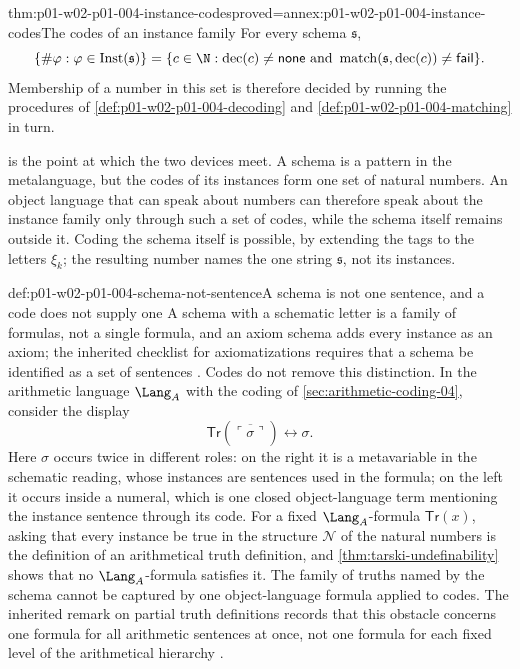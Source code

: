 \begin{hbtheorem}{thm:p01-w02-p01-004-instance-codes}{proved=annex:p01-w02-p01-004-instance-codes}{The codes of an instance family}
For every schema \(\mathfrak s\),
\[
 \{\#\varphi:\varphi\in\operatorname{Inst}(\mathfrak s)\}
 =\{c\in\N:\operatorname{dec}(c)\ne\mathsf{none}\text{ and }
    \operatorname{match}(\mathfrak s,\operatorname{dec}(c))\ne\mathsf{fail}\}.
\]
Membership of a number in this set is therefore decided by running the
procedures of \cref{def:p01-w02-p01-004-decoding} and
\cref{def:p01-w02-p01-004-matching} in turn.
\end{hbtheorem}

 is the point at which the two
devices meet. A schema is a pattern in the metalanguage, but the codes of its
instances form one set of natural numbers. An object language that can speak
about numbers can therefore speak about the instance family only through such
a set of codes, while the schema itself remains outside it. Coding the
schema itself is possible, by extending the tags to the letters \(\xi_k\);
the resulting number names the one string \(\mathfrak s\), not its instances.

\begin{hbwarning}{def:p01-w02-p01-004-schema-not-sentence}{A schema is not one sentence, and a code does not supply one}
A schema with a schematic letter is a family of formulas, not a single
formula, and an axiom schema adds every instance as an axiom; the inherited
checklist for axiomatizations requires that a schema be identified as a set
of sentences \cite[ch.~``Theories and Axiomatization'', warning on writing an
axiomatization, item~6]{FrozenFormalLogicSchemasCodes}. Codes do not remove
this distinction. In the arithmetic language \(\Lang_A\) with the coding of
\cref{sec:arithmetic-coding-04}, consider the display
\[
 \mathsf{Tr}(\overline{\ulcorner\sigma\urcorner})\leftrightarrow\sigma .
\]
Here \(\sigma\) occurs twice in different roles: on the right it is a
metavariable in the schematic reading, whose instances are sentences used in
the formula; on the left it occurs inside a numeral, which is one closed
object-language term mentioning the instance sentence through its code. For
a fixed \(\Lang_A\)-formula \(\mathsf{Tr}(x)\), asking that every instance be
true in the structure \(\mathcal N\) of the natural numbers is the definition
of an arithmetical truth definition, and \cref{thm:tarski-undefinability}
shows that no \(\Lang_A\)-formula satisfies it. The family of truths named by
the schema cannot be captured by one object-language formula applied to
codes. The inherited remark on partial truth definitions records that this
obstacle concerns one formula for all arithmetic sentences at once, not one
formula for each fixed level of the arithmetical hierarchy
\cite[ch.~``Provability, the Second Incompleteness Theorem, and Truth'',
remark ``Partial truth definitions'']{FrozenFormalLogicSchemasCodes}.
\end{hbwarning}

